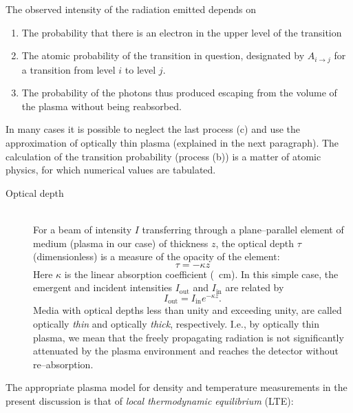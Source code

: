 \documentclass[../main.tex]{subfiles}
\begin{document}
The observed intensity of the radiation emitted depends on \cite{McWhirter1965PlasmaTechniques}
\begin{enumerate}[label=(\alph*)]
\item The probability that there is an electron in the upper level of the transition
\item The atomic probability of the transition in question, designated by $A_{i\to j}$ for a transition from level $i$ to level $j$.
\item The probability of the photons thus produced escaping from the volume of the plasma without being reabsorbed.
\end{enumerate}
In many cases it is possible to neglect the last process (c) and use the approximation of optically thin plasma \cite{McWhirter1965PlasmaTechniques} (explained in the next paragraph). The calculation of the transition probability (process (b)) is a matter of atomic physics, for which numerical values are tabulated.%
\begin{description}
  \item[\textnormal{Optical depth}] \hfill \\ For a beam of intensity $I$ transferring through a plane--parallel element of medium (plasma in our case) of thickness $z$, the optical depth $\tau$ (dimensionless) is a measure of the opacity of the element:
\begin{equation}
    \tau=-\kappa z
\end{equation}
Here $\kappa$ is the linear absorption coefficient (\si{\per\cm}). In this simple case, the emergent and incident intensities $I_\text{out}$ and $I_\text{in}$ are related by 
\begin{equation}
    I_\text{out}=I_\text{in}e^{-\kappa z}.
    \label{eq:radiative-transfer}
\end{equation}
Media with optical depths less than unity and exceeding unity, are called optically \emph{thin} and optically \emph{thick}, respectively. I.e., by optically thin plasma, we mean that the freely propagating radiation is not significantly attenuated by the plasma environment and reaches the detector without re--absorption.
\end{description}

The appropriate plasma model for density and temperature measurements in the present discussion is that of \emph{local thermodynamic equilibrium} (LTE):
\end{document}
